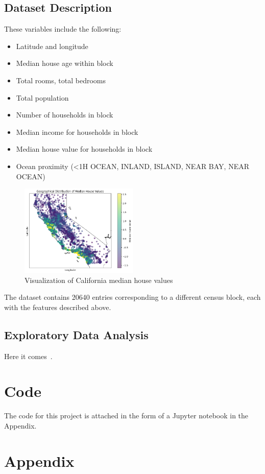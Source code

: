 \documentclass[letterpaper,twocolumn,10pt]{article}
\begin{document}
\subsection{Dataset Description}
These variables include the following:
\begin{itemize}
    \item Latitude and longitude
    \item Median house age within block
    \item Total rooms, total bedrooms
    \item Total population
    \item Number of households in block
    \item Median income for households in block
    \item Median house value for households in block
    \item Ocean proximity (<1H OCEAN, INLAND, ISLAND, NEAR BAY, NEAR OCEAN)
\end{itemize}

\begin{figure}[h]
\centering
\includegraphics[width=0.5\textwidth]{images/california_map.png}
\caption{Visualization of California median house values}
\label{fig:california_map}
\end{figure}

The dataset contains 20640 entries corresponding to a different census block, each with the features described above.

\subsection{Exploratory Data Analysis}

Here it comes~\cite{Einstein}.  


\section{Code}
The code for this project is attached in the form of a Jupyter notebook in the Appendix.


{\footnotesize 
}

\appendix
\section*{Appendix}
\end{document}

